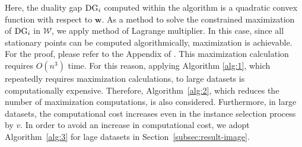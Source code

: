 %
Here, the duality gap ${\rm DG}_i$ computed within the algorithm is a quadratic convex function with respect to $\bm w$.
%
%
As a method to solve the constrained maximization of ${\rm DG}_i$ in $\mathcal{W}$, we apply method of Lagrange multiplier. In this case, since all stationary points can be computed algorithmically, maximization is achievable.
%
For the proof, please refer to the Appendix of \citet{hanada2024distributionallyrobustsafesample}.
%
%
This maximization calculation requires $O\left(n^3\right)$ time.
%
For this reason, applying Algorithm \ref{alg:1}, which repeatedly requires maximization calculations, to large datasets is computationally expensive.
%
Therefore, Algorithm~\ref{alg:2}, which reduces the number of maximization computations, is also considered.
%
Furthermore, in large datasets, the computational cost increases even in the instance selection process by $v$.
%
In order to avoid an increase in computational cost, we adopt Algorithm~\ref{alg:3} for lage datasets in Section~\ref{subsec:result-image}.

